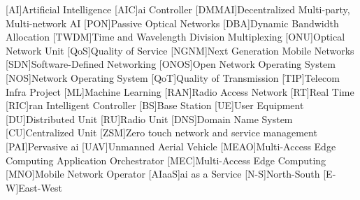 \begin{acronym}
  [AI]{Artificial Intelligence}
  [AIC]{\ac{ai} Controller}
  [DMMAI]{Decentralized Multi-party, Multi-network AI}
  [PON]{Passive Optical Networks}
  [DBA]{Dynamic Bandwidth Allocation}
  [TWDM]{Time and Wavelength Division Multiplexing}
  [ONU]{Optical Network Unit}
  [QoS]{Quality of Service}
  [NGNM]{Next Generation Mobile Networks}
  [SDN]{Software-Defined Networking}
  [ONOS]{Open Network Operating System}
  [NOS]{Network Operating System}
  [QoT]{Quality of Transmission}
  [TIP]{Telecom Infra Project}
  [ML]{Machine Learning}
  [RAN]{Radio Access Network}
  [RT]{Real Time}
  [RIC]{\acs{ran} Intelligent Controller}
  [BS]{Base Station}
  [UE]{User Equipment}
  [DU]{Distributed Unit}
  [RU]{Radio Unit}
  [DNS]{Domain Name System}
  [CU]{Centralized Unit}
  [ZSM]{Zero touch network and service management}
  [PAI]{Pervasive \ac{ai}}
  [UAV]{Unmanned Aerial Vehicle}
  [MEAO]{Multi-Access Edge Computing Application Orchestrator}
  [MEC]{Multi-Access Edge Computing}
  [MNO]{Mobile Network Operator}
  [AIaaS]{\ac{ai} as a Service}
  [N-S]{North-South}
  [E-W]{East-West}
\end{acronym}